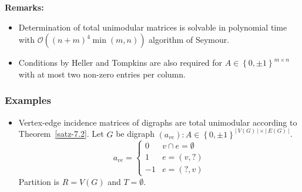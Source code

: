 \documentclass[a4paper]{article}
\theoremstyle{definition}
\newcommand{\card}[1]{\left|\:\!#1\:\!\right|}
\newcommand{\set}[1]{\left\{#1\right\}}
\begin{document}
\textbf{Remarks:}
\begin{itemize}
  \item Determination of total unimodular matrices is solvable in polynomial time with $\mathcal{O}((n + m)^4 \min{(m, n)})$ algorithm of Seymour.
  \item Conditions by Heller and Tompkins are also required for $A \in \set{0, \pm 1}^{m \times n}$ with at most two non-zero entries per column.
\end{itemize}

\subsubsection{Examples}
\begin{itemize}
  \item
    Vertex-edge incidence matrices of digraphs are total unimodular according to Theorem~\ref{satz-7.2}.
    Let $G$ be digraph $(a_{ve}): A \in \set{0, \pm 1}^{\card{V(G)} \times \card{E(G)}}$.
    \[
      a_{ve} = \begin{cases}
        0   & v \cap e = \emptyset \\
        1   & e = (v, ?) \\
        -1  & e = (?, v)
      \end{cases}
    \]
    Partition is $R = V(G)$ and $T = \emptyset$.


\end{itemize}
\end{document}
